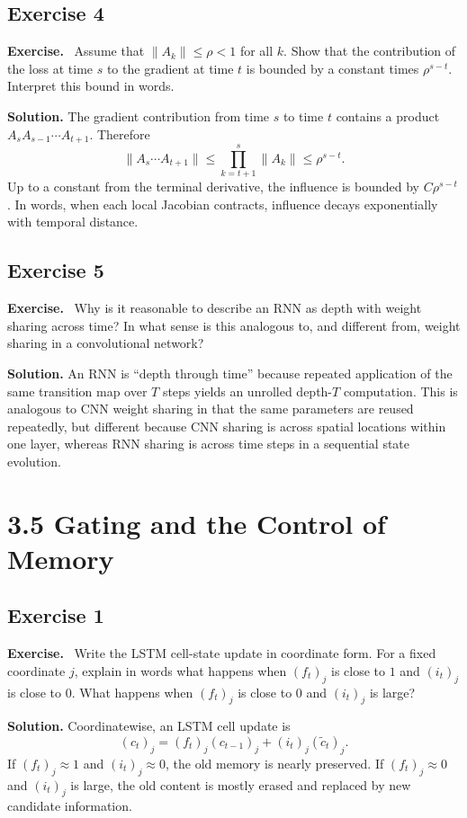 \documentclass[11pt]{article}
\newenvironment{exercisebox}{\begin{framed}\noindent\textbf{Exercise.}\ }{\end{framed}}
\begin{document}
\subsection*{Exercise 4}
\begin{exercisebox}
Assume that $\|A_k\|\leq \rho<1$ for all $k$.
Show that the contribution of the loss at time $s$ to the gradient at time $t$ is bounded by a constant times $\rho^{s-t}$.
Interpret this bound in words.
\end{exercisebox}
\textbf{Solution.} The gradient contribution from time $s$ to time $t$ contains a product $A_sA_{s-1}\cdots A_{t+1}$. Therefore
\[
\|A_s\cdots A_{t+1}\|\le \prod_{k=t+1}^{s}\|A_k\|\le \rho^{s-t}.
\]
Up to a constant from the terminal derivative, the influence is bounded by $C\rho^{s-t}$. In words, when each local Jacobian contracts, influence decays exponentially with temporal distance.

\subsection*{Exercise 5}
\begin{exercisebox}
Why is it reasonable to describe an RNN as depth with weight sharing across time?
In what sense is this analogous to, and different from, weight sharing in a convolutional network?
\end{exercisebox}
\textbf{Solution.} An RNN is ``depth through time'' because repeated application of the same transition map over $T$ steps yields an unrolled depth-$T$ computation. This is analogous to CNN weight sharing in that the same parameters are reused repeatedly, but different because CNN sharing is across spatial locations within one layer, whereas RNN sharing is across time steps in a sequential state evolution.

\section{3.5 Gating and the Control of Memory}
\subsection*{Exercise 1}
\begin{exercisebox}
Write the LSTM cell-state update in coordinate form.
For a fixed coordinate $j$, explain in words what happens when $(f_t)_j$ is close to $1$ and $(i_t)_j$ is close to $0$.
What happens when $(f_t)_j$ is close to $0$ and $(i_t)_j$ is large?
\end{exercisebox}
\textbf{Solution.} Coordinatewise, an LSTM cell update is
\[
(c_t)_j=(f_t)_j(c_{t-1})_j + (i_t)_j(\tilde c_t)_j.
\]
If $(f_t)_j\approx 1$ and $(i_t)_j\approx 0$, the old memory is nearly preserved. If $(f_t)_j\approx 0$ and $(i_t)_j$ is large, the old content is mostly erased and replaced by new candidate information.
\end{document}

